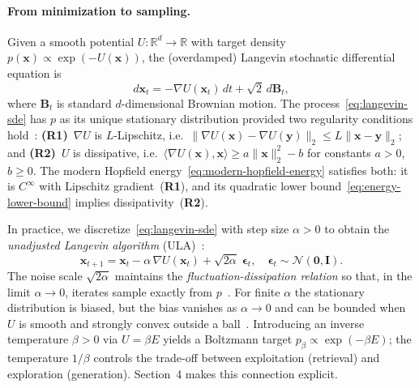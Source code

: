 \paragraph{From minimization to sampling.}
Given a smooth potential $U:\mathbb{R}^d\to\mathbb{R}$ with target density $p(\mathbf{x})\propto\exp(-U(\mathbf{x}))$, the (overdamped) Langevin stochastic differential equation is
\begin{equation}\label{eq:langevin-sde}
    d\mathbf{x}_t = -\nabla U(\mathbf{x}_t)\,dt + \sqrt{2}\,d\mathbf{B}_t,
\end{equation}
where $\mathbf{B}_t$ is standard $d$-dimensional Brownian motion. The process~\eqref{eq:langevin-sde} has $p$ as its unique stationary distribution provided two regularity conditions hold~\cite{robertsTweedieExponentialConvergence1996}: \textbf{(R1)}~$\nabla U$ is $L$-Lipschitz, i.e.\ $\|\nabla U(\mathbf{x})-\nabla U(\mathbf{y})\|_2\le L\|\mathbf{x}-\mathbf{y}\|_2$; and \textbf{(R2)}~$U$ is dissipative, i.e.\ $\langle \nabla U(\mathbf{x}),\mathbf{x}\rangle \ge a\|\mathbf{x}\|_2^2 - b$ for constants $a>0$, $b\ge 0$.
The modern Hopfield energy~\eqref{eq:modern-hopfield-energy} satisfies both: it is $C^{\infty}$ with Lipschitz gradient~(\textbf{R1}), and its quadratic lower bound~\eqref{eq:energy-lower-bound} implies dissipativity~(\textbf{R2}).

In practice, we discretize~\eqref{eq:langevin-sde} with step size $\alpha>0$ to obtain the \emph{unadjusted Langevin algorithm} (ULA)~\cite{robertsTweedieExponentialConvergence1996}:
\begin{equation}\label{eq:ula}
    \mathbf{x}_{t+1}
    = \mathbf{x}_t - \alpha\,\nabla U(\mathbf{x}_t) + \sqrt{2\alpha}\;\boldsymbol{\epsilon}_t,
    \quad \boldsymbol{\epsilon}_t\sim\mathcal{N}(\mathbf{0},\mathbf{I}).
\end{equation}
The noise scale $\sqrt{2\alpha}$ maintains the \emph{fluctuation-dissipation relation} so that, in the limit $\alpha\to 0$, iterates sample exactly from $p$~\cite{wellingBayesianLearningStochastic2011}. For finite $\alpha$ the stationary distribution is biased, but the bias vanishes as $\alpha\to 0$ and can be bounded when $U$ is smooth and strongly convex outside a ball~\cite{durmusNonasymptoticAnalysisUnadjusted2017}. Introducing an inverse temperature $\beta>0$ via $U=\beta E$ yields a Boltzmann target $p_\beta\propto\exp(-\beta E)$; the temperature $1/\beta$ controls the trade-off between exploitation (retrieval) and exploration (generation). Section~4 makes this connection explicit.